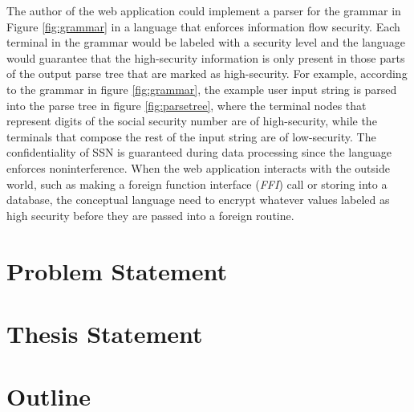 The author of the web application could implement a parser for the
grammar in Figure \ref{fig:grammar} in a language that enforces
information flow security.  Each terminal in the grammar would be
labeled with a security level and the language would guarantee that
the high-security information is only present in those parts of the
output parse tree that are marked as high-security.  For example,
according to the grammar in figure \ref{fig:grammar}, the example user
input string is parsed into the parse tree in figure
\ref{fig:parsetree}, where the terminal nodes that represent digits of
the social security number are of {\color{red} high-security}, while
the terminals that compose the rest of the input string are of
{\color{blue} low-security}.  The confidentiality of SSN is guaranteed
during data processing since the language enforces
noninterference. When the web application interacts with the outside
world, such as making a foreign function interface (\textit{FFI}) call
or storing into a database, the conceptual language need to encrypt
whatever values labeled as high security before they are passed into a
foreign routine.

\section{Problem Statement}

\section{Thesis Statement}


\section{Outline}
